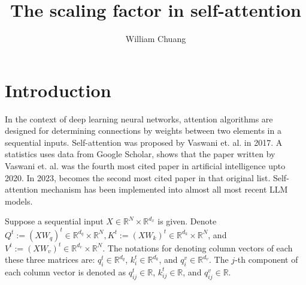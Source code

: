 \documentclass{article}
\theoremstyle{plain}
\theoremstyle{plain} %
\theoremstyle{definition}  %
\theoremstyle{remark}  %
\theoremstyle{plain}
\begin{document}
\title{The scaling factor in self-attention}

\author{William Chuang}

\maketitle


\section{Introduction}


In the context of deep learning neural networks, attention algorithms are designed for determining connections by weights between two elements in a sequential inputs. Self-attention was proposed by Vaswani et. al.\cite{vaswani2017attention} in 2017. A statistics uses data from Google Scholar\cite{crew2020google}, shows that the paper written by Vaswani et. al.\cite{vaswani2017attention} was the fourth most cited paper in artificial intelligence upto 2020. In 2023, \cite{vaswani2017attention} becomes the second most cited paper in that original list. Self-attention mechanism has been implemented into almost all most recent LLM models. 


Suppose a sequential input $X\in \mathbb{R}^N\times \mathbb{R}^{d_x}$ is given. Denote $Q^t:=(XW_q)^t\in \mathbb{R}^{d_q}\times\mathbb{R}^{N}, K^t:=(XW_k)^t\in \mathbb{R}^{d_k}\times\mathbb{R}^{N}$, and $V^t:=(XW_v)^t\in \mathbb{R}^{d_v}\times\mathbb{R}^{N}$. The notations for denoting column vectors of each these three matrices are: $q^t_i\in \mathbb{R}^{d_q}$, $k^t_i\in \mathbb{R}^{d_k}$, and $q^v_i\in \mathbb{R}^{d_v}$. The $j$-th component of each column vector is denoted as $q^t_{ij}\in \mathbb{R}$, $k^t_{ij}\in \mathbb{R}$, and $q^v_{ij}\in \mathbb{R}$.
\end{document}
